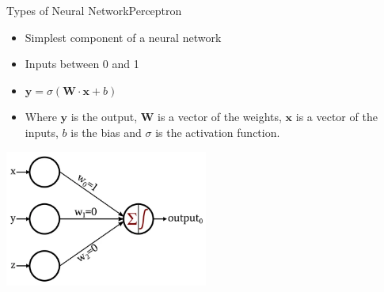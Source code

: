 \documentclass{beamer}
\begin{document}
\begin{frame}{Types of Neural Network}{Perceptron}
\begin{multicols}{2}
    \begin{itemize}
        \item Simplest component of a neural network
        \item Inputs between 0 and 1
        \item $\textbf{y} = \sigma(\textbf{W}\cdot\textbf{x} + b)$
        \item Where $\textbf{y}$ is the output, $\textbf{W}$ is a vector of the weights, $\textbf{x}$ is a vector of the inputs, $b$ is the bias and $\sigma$ is the activation function.
    \end{itemize}
    \begin{center}
        \includegraphics[width=0.5\textwidth]{images/perceptron}
    \end{center}
\end{multicols}
\end{frame}
\end{document}
